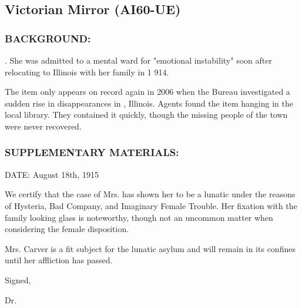 \subsection*{Victorian Mirror (AI60-UE)}
\subsubsection*{BACKGROUND:}
\par {}. She was admitted to a mental ward for "emotional instability" soon after
relocating to Illinois with her family in 1 914.
\par The item only appears on record again in 2006 when the Bureau
investigated a sudden rise in disappearances in , Illinois. Agents found the item hanging in the local library. They contained it quickly, though the missing people of the town were
never recovered.
\subsubsection*{SUPPLEMENTARY MATERIALS:}
\par DATE: August 18th, 1915
\par We certify that the case of Mrs.  has shown her to
be a lunatic under the reasons of Hysteria, Bad Company, and
Imaginary Female Trouble. Her fixation with the family looking
glass is noteworthy, though not an uncommon matter when
considering the female disposition.
\par Mrs. Carver is a fit subject for the lunatic asylum and will remain in
its confines until her affliction has passed.
\par Signed,
\par Dr. 